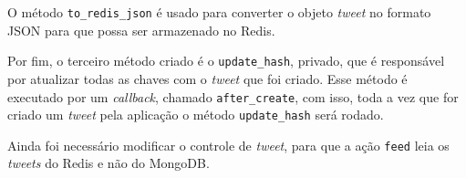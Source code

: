 O método \verb|to_redis_json| é usado para converter o objeto \textit{tweet} no formato JSON para que possa ser armazenado no \ac{Redis}.

Por fim, o terceiro método criado é o \verb|update_hash|, privado, que é responsável por atualizar todas as chaves com o \textit{tweet} que foi criado. Esse método é executado por um \textit{callback}, chamado \verb|after_create|, com isso, toda a vez que for criado um \textit{tweet} pela aplicação o método \verb|update_hash| será rodado.

Ainda foi necessário modificar o controle de \textit{tweet}, para que a ação \verb|feed| leia os \textit{tweets} do \ac{Redis} e não do MongoDB.









